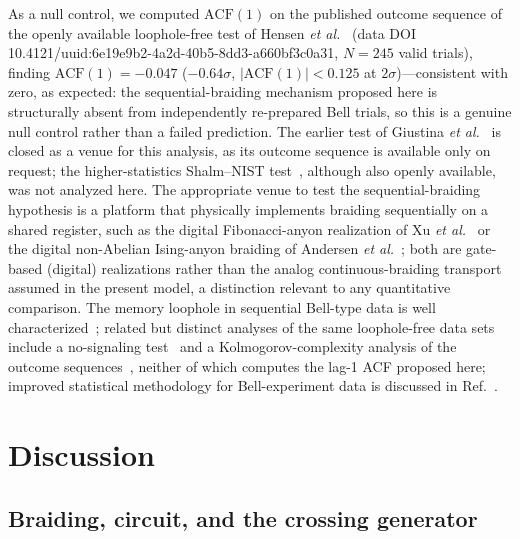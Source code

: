 \documentclass[aps,pra,twocolumn,superscriptaddress,longbibliography,floatfix,nofootinbib]{revtex4-2}
\begin{document}
As a null control, we computed $\text{ACF}(1)$ on the published
outcome sequence of the openly available loophole-free test of Hensen
\emph{et al.}~\cite{Hensen2015} (data DOI
10.4121/uuid:6e19e9b2-4a2d-40b5-8dd3-a660bf3c0a31, $N=245$ valid
trials), finding
$\text{ACF}(1)=-0.047$ ($-0.64\sigma$, $|\text{ACF}(1)|<0.125$ at
$2\sigma$)---consistent with zero, as expected: the sequential-braiding
mechanism proposed here is structurally absent from independently
re-prepared Bell trials, so this is a genuine null control rather
than a failed prediction. The earlier test of Giustina \emph{et
al.}~\cite{Giustina2015} is closed as a venue for this analysis, as
its outcome sequence is available only on request; the higher-statistics
Shalm--NIST test~\cite{Shalm2015}, although also openly available, was
not analyzed here.
The appropriate venue to test the sequential-braiding hypothesis is
a platform that physically implements braiding sequentially on a
shared register, such as the digital Fibonacci-anyon realization of
Xu \emph{et al.}~\cite{XuEtAl2024} or the digital non-Abelian
Ising-anyon braiding of Andersen \emph{et al.}~\cite{Google2023};
both are gate-based (digital) realizations rather than the analog
continuous-braiding transport assumed in the present model, a
distinction relevant to any quantitative comparison.
The memory loophole in sequential Bell-type
data is well
characterized~\cite{BarrettCollinsHardyKentPopescu2002}; related but
distinct analyses of the same loophole-free data sets include a
no-signaling test~\cite{AdenierKhrennikov2017} and a
Kolmogorov-complexity analysis of the outcome
sequences~\cite{KovalskyHniloAguero2018,KovalskyHniloAguero2018b},
neither of which computes the lag-1 ACF proposed here; improved
statistical methodology for Bell-experiment data is discussed in
Ref.~\cite{Gill2022}.

\section{Discussion}
\label{sec:discussion}

\subsection{Braiding, circuit, and the crossing generator}
\end{document}
